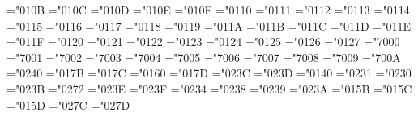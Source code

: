 \def\Pr{\mathop{\fam0\tenrm@ Pr}}
\def\gcd{\mathop{\fam0\tenrm@ gcd}}
\def\deg{\mathop{\fam0\tenrm@ deg}\nolimits}
\def\bigl{\mathopen\big}
\def\bigm{\mathrel\big}
\def\bigr{\mathclose\big}
\def\Bigl{\mathopen\Big}
\def\Bigm{\mathrel\Big}
\def\Bigr{\mathclose\Big}
\def\biggl{\mathopen\bigg}
\def\biggm{\mathrel\bigg}
\def\biggr{\mathclose\bigg}
\def\Biggl{\mathopen\Bigg}
\def\Biggm{\mathrel\Bigg}
\def\Biggr{\mathclose\Bigg}
\def\big#1{{\hbox{$\left#1\vbox to8.5pt{}\right.\n@space$}}}
\def\Big#1{{\hbox{$\left#1\vbox to11.5pt{}\right.\n@space$}}}
\def\bigg#1{{\hbox{$\left#1\vbox to14.5pt{}\right.\n@space$}}}
\def\Bigg#1{{\hbox{$\left#1\vbox to17.5pt{}\right.\n@space$}}}
\def\n@space{\nulldelimiterspace0pt \mathsurround0pt}
\mathchardef\alpha="010B
\mathchardef\beta="010C
\mathchardef\gamma="010D
\mathchardef\delta="010E
\mathchardef\epsilon="010F
\mathchardef\zeta="0110
\mathchardef\eta="0111
\mathchardef\theta="0112
\mathchardef\iota="0113
\mathchardef\kappa="0114
\mathchardef\lambda="0115
\mathchardef\mu="0116
\mathchardef\nu="0117
\mathchardef\xi="0118
\mathchardef\pi="0119
\mathchardef\rho="011A
\mathchardef\sigma="011B
\mathchardef\tau="011C
\mathchardef\upsilon="011D
\mathchardef\phi="011E
\mathchardef\chi="011F
\mathchardef\psi="0120
\mathchardef\omega="0121
\mathchardef\varepsilon="0122
\mathchardef\vartheta="0123
\mathchardef\varpi="0124
\mathchardef\varrho="0125
\mathchardef\varsigma="0126
\mathchardef\varphi="0127
\mathchardef\Gamma="7000
\mathchardef\Delta="7001
\mathchardef\Theta="7002
\mathchardef\Lambda="7003
\mathchardef\Xi="7004
\mathchardef\Pi="7005
\mathchardef\Sigma="7006
\mathchardef\Upsilon="7007
\mathchardef\Phi="7008
\mathchardef\Psi="7009
\mathchardef\Omega="700A
\mathchardef\aleph="0240
\def\hbar{{\mathchar'26\mkern-9muh}}
\mathchardef\imath="017B
\mathchardef\jmath="017C
\mathchardef\ell="0160
\mathchardef\wp="017D
\mathchardef\Re="023C
\mathchardef\Im="023D
\mathchardef\partial="0140
\mathchardef\infty="0231
\mathchardef\prime="0230
\mathchardef\emptyset="023B
\mathchardef\nabla="0272
\def\surd{{\mathchar"1270}}
\mathchardef\top="023E
\mathchardef\bot="023F
\def\angle{{\vbox{\everycr{}\tabskip0pt plus0pt minus0pt\halign{$\mathsurround0pt\scriptstyle##$\crcr
      \not\mathrel{\mkern14mu}\crcr
      \noalign{\prevdepth-1000pt}
      \mkern2.5mu\leaders\hrule height.34pt\hfill\mkern2.5mu\crcr}}}}
\mathchardef\triangle="0234
\mathchardef\forall="0238
\mathchardef\exists="0239
\mathchardef\neg="023A \let\lnot=\neg
\mathchardef\flat="015B
\mathchardef\natural="015C
\mathchardef\sharp="015D
\mathchardef\clubsuit="027C
\mathchardef\diamondsuit="027D
